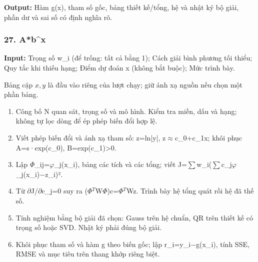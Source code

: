 \textbf{Output:} Hàm g(\allowbreak{}x),\allowbreak{} tham số gốc,\allowbreak{} bảng thiết kế/\allowbreak{}tổng,\allowbreak{} hệ và nhật ký bộ giải,\allowbreak{} phần dư và sai số có định nghĩa rõ.

\examplebreak\subsubsection*{27. A*b\textasciicircum{}x}

\textbf{Input:} Trọng số w\_i (\allowbreak{}để trống: tất cả bằng 1);\allowbreak{} Cách giải bình phương tối thiểu;\allowbreak{} Quy tắc khi thiếu hạng;\allowbreak{} Điểm dự đoán x (\allowbreak{}không bắt buộc);\allowbreak{} Mức trình bày.

Bảng cặp $x,y$ là đầu vào riêng của lượt chạy; giữ ánh xạ nguồn nếu chọn một phần bảng.

\begin{enumerate}

\item Công bố N quan sát,\allowbreak{} trọng số và mô hình. Kiểm tra miền,\allowbreak{} dấu và hạng;\allowbreak{} không tự lọc dòng để ép phép biến đổi hợp lệ.

\item Viết phép biến đổi và ánh xạ tham số: z=\allowbreak{}ln|y|,\allowbreak{} z\ensuremath{\approx}c\_0+\allowbreak{}c\_1x;\allowbreak{} khôi phục A=\allowbreak{}s·exp(\allowbreak{}c\_0),\allowbreak{} B=\allowbreak{}exp(\allowbreak{}c\_1)>0.

\item Lập \ensuremath{\Phi}\_ij=\allowbreak{}\ensuremath{\varphi}\_j(\allowbreak{}x\_i),\allowbreak{} bảng các tích và các tổng;\allowbreak{} viết J=\allowbreak{}\ensuremath{\sum}w\_i(\allowbreak{}\ensuremath{\sum}c\_j\ensuremath{\varphi}\_j(\allowbreak{}x\_i)\ensuremath{-}z\_i)².

\item Từ \ensuremath{\partial}J/\allowbreak{}\ensuremath{\partial}c\_j=\allowbreak{}0 suy ra (\allowbreak{}\ensuremath{\Phi}\ensuremath{{}^T}W\ensuremath{\Phi})c=\allowbreak{}\ensuremath{\Phi}\ensuremath{{}^T}Wz. Trình bày hệ tổng quát rồi hệ đã thế số.

\item Tính nghiệm bằng bộ giải đã chọn: Gauss trên hệ chuẩn,\allowbreak{} QR trên thiết kế có trọng số hoặc SVD. Nhật ký phải đúng bộ giải.

\item Khôi phục tham số và hàm g theo biến gốc;\allowbreak{} lập r\_i=\allowbreak{}y\_i\ensuremath{-}g(\allowbreak{}x\_i),\allowbreak{} tính SSE,\allowbreak{} RMSE và mục tiêu trên thang khớp riêng biệt.

\end{enumerate}

